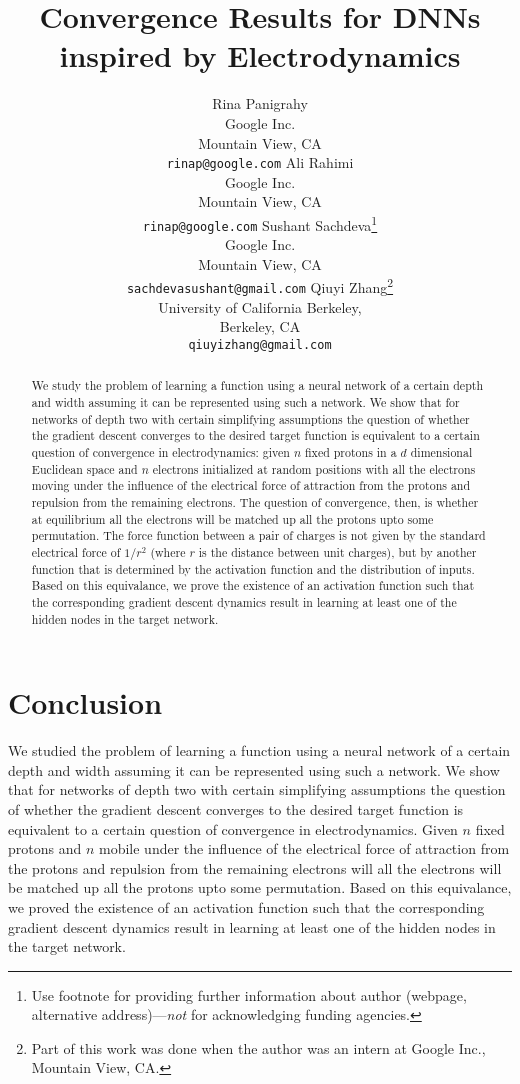 \documentclass{article}
\title{Convergence Results for DNNs inspired by Electrodynamics
}
\author{
Rina Panigrahy \\
Google Inc. \\
Mountain View, CA\\
\texttt{rinap@google.com}
Ali Rahimi \\
Google Inc. \\
Mountain View, CA\\
\texttt{rinap@google.com}
\And
 Sushant Sachdeva\thanks{Use footnote for providing further
    information about author (webpage, alternative
    address)---\emph{not} for acknowledging funding agencies.}  \\
Google Inc. \\
Mountain View, CA \\
\texttt{sachdevasushant@gmail.com}  
\And
Qiuyi Zhang\thanks{Part of this work was done when the author was
an intern at Google Inc., Mountain View, CA.}  \\
University of California Berkeley, \\
Berkeley, CA \\
\texttt{qiuyizhang@gmail.com}
}
\begin{document}
 
\maketitle

\begin{abstract} 
	We study the problem of learning a function using a neural network of a certain depth and width assuming it can
be represented using such a network.  We show that for networks of depth two with certain simplifying assumptions  the question of whether the gradient descent converges to the desired target function is equivalent to a certain question of convergence in electrodynamics: given $n$ fixed protons in a $d$ dimensional Euclidean space and $n$ electrons initialized at random positions with all the electrons moving under the influence of the electrical force of attraction from the protons and repulsion from the remaining electrons. The question of convergence, then, is whether at equilibrium all the electrons will be matched up all the protons upto some permutation. The force function between a pair of charges is not given by the standard electrical force of $1/r^2$ (where $r$ is the distance between unit charges), but by another function that is determined by the activation function and the distribution of inputs.  Based on this equivalance, we prove the existence of an activation function such that the corresponding gradient descent dynamics result in learning at least one of the hidden nodes in the target network. 
\end{abstract} 








\section{Conclusion}

We studied the problem of learning a function using a neural network of a certain depth and width assuming it can
be represented using such a network.   We show that for networks of depth two with certain simplifying assumptions  the question of whether the gradient descent converges to the desired target function is equivalent to a certain question of convergence in electrodynamics.  Given $n$  fixed protons and $n$ mobile under the influence of the electrical force of attraction from the protons and repulsion from the remaining electrons will all the electrons will be matched up all the protons upto some permutation. Based on this equivalance, we proved the existence of an activation function such that the corresponding gradient descent dynamics result in learning at least one of the hidden nodes in the target network. 
\end{document}
